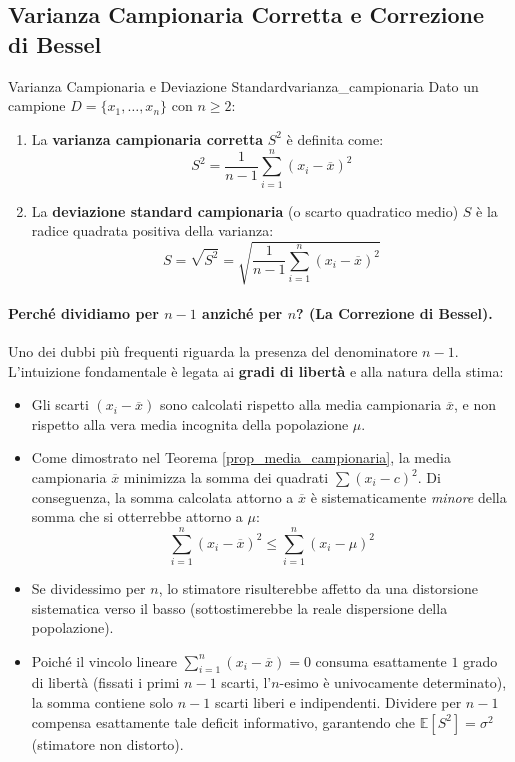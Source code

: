 \subsection{Varianza Campionaria Corretta e Correzione di Bessel}

\begin{definizione}{Varianza Campionaria e Deviazione Standard}{varianza_campionaria}
Dato un campione $D = \{x_1, \dots, x_n\}$ con $n \ge 2$:
\begin{enumerate}
    \item La \textbf{varianza campionaria corretta} $S^2$ è definita come:
    \begin{equation}
    S^2 = \frac{1}{n-1}\sum_{i=1}^n (x_i - \overline{x})^2
    \end{equation}
    \item La \textbf{deviazione standard campionaria} (o scarto quadratico medio) $S$ è la radice quadrata positiva della varianza:
    \begin{equation}
    S = \sqrt{S^2} = \sqrt{\frac{1}{n-1}\sum_{i=1}^n (x_i - \overline{x})^2}
    \end{equation}
\end{enumerate}
\end{definizione}

\paragraph{Perché dividiamo per $n-1$ anziché per $n$? (La Correzione di Bessel).}
Uno dei dubbi più frequenti riguarda la presenza del denominatore $n-1$. L'intuizione fondamentale è legata ai \textbf{gradi di libertà} e alla natura della stima:
\begin{itemize}
    \item Gli scarti $(x_i - \overline{x})$ sono calcolati rispetto alla media campionaria $\overline{x}$, e non rispetto alla vera media incognita della popolazione $\mu$.
    \item Come dimostrato nel Teorema \ref{prop_media_campionaria}, la media campionaria $\overline{x}$ minimizza la somma dei quadrati $\sum (x_i - c)^2$. Di conseguenza, la somma calcolata attorno a $\overline{x}$ è sistematicamente \emph{minore} della somma che si otterrebbe attorno a $\mu$:
    \begin{equation}
    \sum_{i=1}^n (x_i - \overline{x})^2 \le \sum_{i=1}^n (x_i - \mu)^2
    \end{equation}
    \item Se dividessimo per $n$, lo stimatore risulterebbe affetto da una distorsione sistematica verso il basso (sottostimerebbe la reale dispersione della popolazione).
    \item Poiché il vincolo lineare $\sum_{i=1}^n (x_i - \overline{x}) = 0$ consuma esattamente $1$ grado di libertà (fissati i primi $n-1$ scarti, l'$n$-esimo è univocamente determinato), la somma contiene solo $n-1$ scarti liberi e indipendenti. Dividere per $n-1$ compensa esattamente tale deficit informativo, garantendo che $\mathbb{E}[S^2] = \sigma^2$ (stimatore non distorto).
\end{itemize}

